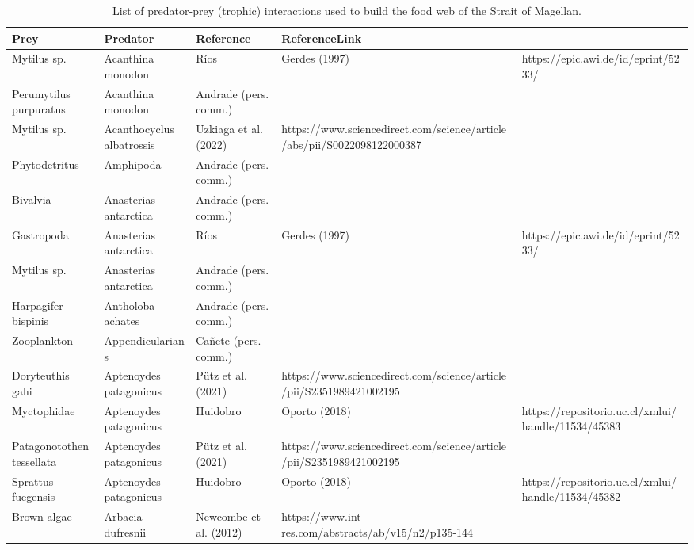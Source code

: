 \documentclass[
]{article}
\begin{document}
\newpage
\begin{landscape}

\begin{longtable}[t]{>{\raggedright\arraybackslash}p{4cm}>{\centering\arraybackslash}p{4cm}>{\centering\arraybackslash}p{6cm}>{\centering\arraybackslash}p{6cm}}
\caption{\label{tab:tableS1}List of predator-prey (trophic) interactions used to build the food web of the Strait of Magellan.}\\
\toprule
Prey & Predator & Reference & ReferenceLink\\
\midrule
Mytilus sp. & Acanthina monodon & \tiny Ríos & Gerdes (1997) & \tiny https://epic.awi.de/id/eprint/5233/\\
Perumytilus purpuratus & Acanthina monodon & \tiny Andrade (pers. comm.) & \tiny\\
Mytilus sp. & Acanthocyclus albatrossis & \tiny Uzkiaga et al. (2022) & \tiny https://www.sciencedirect.com/science/article/abs/pii/S0022098122000387\\
Phytodetritus & Amphipoda & \tiny Andrade (pers. comm.) & \tiny\\
Bivalvia & Anasterias antarctica & \tiny Andrade (pers. comm.) & \tiny\\
\addlinespace
Gastropoda & Anasterias antarctica & \tiny Ríos & Gerdes (1997) & \tiny https://epic.awi.de/id/eprint/5233/\\
Mytilus sp. & Anasterias antarctica & \tiny Andrade (pers. comm.) & \tiny\\
Harpagifer bispinis & Antholoba achates & \tiny Andrade (pers. comm.) & \tiny\\
Zooplankton & Appendicularians & \tiny Cañete (pers. comm.) & \tiny\\
Doryteuthis gahi & Aptenoydes patagonicus & \tiny Pütz et al. (2021) & \tiny https://www.sciencedirect.com/science/article/pii/S2351989421002195\\
\addlinespace
Myctophidae & Aptenoydes patagonicus & \tiny Huidobro & Oporto (2018) & \tiny https://repositorio.uc.cl/xmlui/handle/11534/45383\\
Patagonotothen tessellata & Aptenoydes patagonicus & \tiny Pütz et al. (2021) & \tiny https://www.sciencedirect.com/science/article/pii/S2351989421002195\\
Sprattus fuegensis & Aptenoydes patagonicus & \tiny Huidobro & Oporto (2018) & \tiny https://repositorio.uc.cl/xmlui/handle/11534/45382\\
Brown algae & Arbacia dufresnii & \tiny Newcombe et al. (2012) & \tiny https://www.int-res.com/abstracts/ab/v15/n2/p135-144\\

\end{longtable}
\end{landscape}
\end{document}
